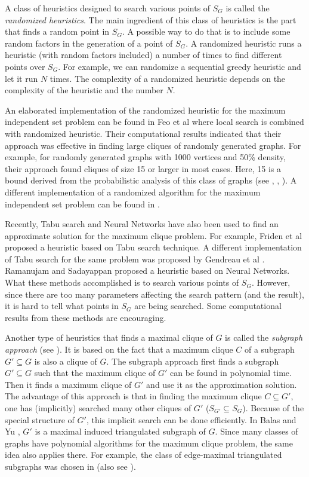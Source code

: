 A class of heuristics designed to search various points of $S_G$ is
called the {\em randomized heuristics}. The main ingredient of this
class of heuristics is the part that finds a random point in $S_G$.
A possible way to do that is to include some random factors in the
generation of a point of $S_G$. A randomized heuristic runs a
heuristic (with random factors included) a number of times to find
different points over $S_G$. For example, we can randomize a
sequential greedy heuristic and let it run $N$ times. The complexity
of a randomized heuristic depends on the complexity of the heuristic
and the number $N$.

An elaborated implementation of the randomized heuristic for the
maximum independent set problem can be found in Feo et al
\cite{FeReSm90} where local search is combined with randomized
heuristic. Their computational results indicated that their approach
was effective in finding large cliques of randomly generated graphs.
For example, for randomly generated graphs with 1000 vertices and
50\% density, their approach found cliques of size 15 or larger in
most cases. Here, 15 is a bound derived from the probabilistic analysis
of this class of graphs (see \cite{Bol85}, \cite{BoEr76},
\cite{Fri90}). A different implementation of a randomized
algorithm for the maximum independent set problem can be found in
\cite{AlBaIt86}.

Recently, Tabu search and Neural Networks have also been used to find
an approximate solution for the maximum clique problem. For
example, Friden et al \cite{FrHeWe89} proposed a heuristic based on
Tabu search technique. A different implementation of Tabu search for
the same problem was proposed by Gendreau et al \cite{GeSaSo89}.
Ramanujam and Sadayappan \cite{RaSa88} proposed a heuristic based on
Neural Networks. What these methods accomplished is to search
various points of $S_G$. However, since there are too many
parameters affecting the search pattern (and the result), it is hard
to tell what points in $S_G$ are being searched. Some computational
results from these methods are encouraging. 


Another type of heuristics that finds a maximal clique of $G$ is
called the {\em subgraph approach} (see \cite{BaYu86}). It is based
on the fact that a maximum clique $C$ of a subgraph $G' \subseteq G$
is also a clique of $G$. The subgraph approach first finds a
subgraph $G' \subseteq G$ such that the maximum clique of $G'$ can
be found in polynomial time. Then it finds a maximum clique of $G'$
and use it as the approximation solution. The advantage of this
approach is that in finding the maximum clique $C \subseteq G'$, one
has (implicitly) searched many other cliques of $G'$ ($S_{G'}
\subseteq S_G$). Because of the special structure of $G'$, this
implicit search can be done efficiently. In Balas and Yu
\cite{BaYu86}, $G'$ is a maximal induced triangulated subgraph of
$G$. Since many classes of graphs have polynomial algorithms for the
maximum clique problem, the same idea also applies there. For
example, the class of edge-maximal triangulated subgraphs was chosen
in \cite{Xue91} (also see \cite{Bal86}).

